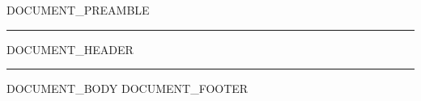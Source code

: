 {{DOCUMENT_PREAMBLE}}

\begin{center}
\rule{0.75\linewidth}{0.8pt}
\end{center}
\vspace{6pt}
{{DOCUMENT_HEADER}}
\vspace{4pt}
\begin{center}
\rule{0.75\linewidth}{0.4pt}
\end{center}
\vspace{12pt}
{{DOCUMENT_BODY}}
{{DOCUMENT_FOOTER}}

